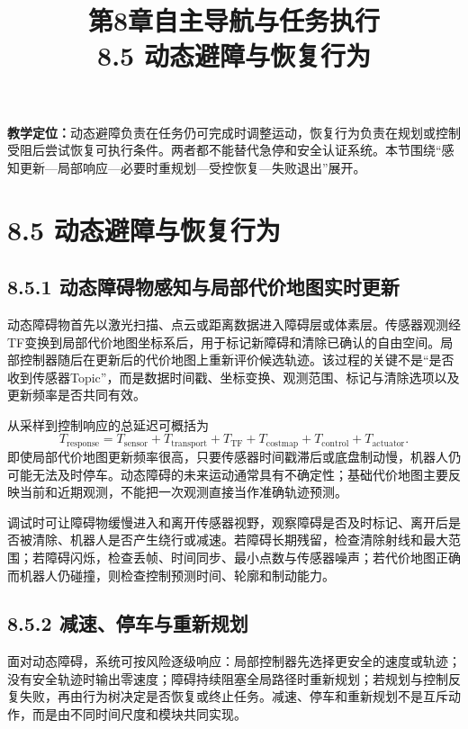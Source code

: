 \documentclass[UTF8,zihao=-4]{ctexart}
\title{第8章自主导航与任务执行\\\large 8.5 动态避障与恢复行为}
\author{}\date{}
\begin{document}
\maketitle

\noindent\textbf{教学定位：}动态避障负责在任务仍可完成时调整运动，恢复行为负责在规划或控制受阻后尝试恢复可执行条件。两者都不能替代急停和安全认证系统。本节围绕“感知更新---局部响应---必要时重规划---受控恢复---失败退出”展开。

\section*{8.5 动态避障与恢复行为}

\subsection*{8.5.1 动态障碍物感知与局部代价地图实时更新}

动态障碍物首先以激光扫描、点云或距离数据进入障碍层或体素层。传感器观测经TF变换到局部代价地图坐标系后，用于标记新障碍和清除已确认的自由空间。局部控制器随后在更新后的代价地图上重新评价候选轨迹。该过程的关键不是“是否收到传感器Topic”，而是数据时间戳、坐标变换、观测范围、标记与清除选项以及更新频率是否共同有效。

从采样到控制响应的总延迟可概括为
\begin{equation}
  T_{\mathrm{response}}=
  T_{\mathrm{sensor}}+T_{\mathrm{transport}}+T_{\mathrm{TF}}+
  T_{\mathrm{costmap}}+T_{\mathrm{control}}+T_{\mathrm{actuator}}.
  \label{eq:obstacle-response-delay}
\end{equation}
即使局部代价地图更新频率很高，只要传感器时间戳滞后或底盘制动慢，机器人仍可能无法及时停车。动态障碍的未来运动通常具有不确定性；基础代价地图主要反映当前和近期观测，不能把一次观测直接当作准确轨迹预测。

调试时可让障碍物缓慢进入和离开传感器视野，观察障碍是否及时标记、离开后是否被清除、机器人是否产生绕行或减速。若障碍长期残留，检查清除射线和最大范围；若障碍闪烁，检查丢帧、时间同步、最小点数与传感器噪声；若代价地图正确而机器人仍碰撞，则检查控制预测时间、轮廓和制动能力。

\subsection*{8.5.2 减速、停车与重新规划}

面对动态障碍，系统可按风险逐级响应：局部控制器先选择更安全的速度或轨迹；没有安全轨迹时输出零速度；障碍持续阻塞全局路径时重新规划；若规划与控制反复失败，再由行为树决定是否恢复或终止任务。减速、停车和重新规划不是互斥动作，而是由不同时间尺度和模块共同实现。
\end{document}
